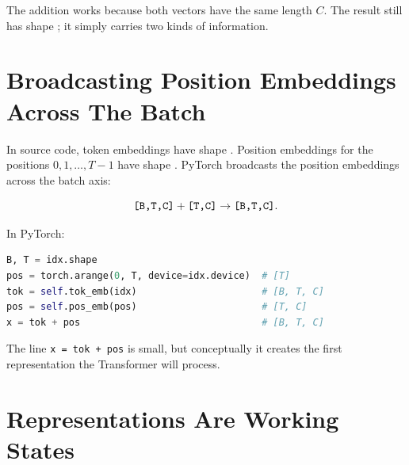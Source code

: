 The addition works because both vectors have the same length \(C\). The result still has shape \shape{[C]}; it simply carries two kinds of information.

\section{Broadcasting Position Embeddings Across The Batch}

In source code, token embeddings have shape \shape{[B,T,C]}. Position embeddings for the positions \(0,1,\ldots,T-1\) have shape \shape{[T,C]}. PyTorch broadcasts the position embeddings across the batch axis:

\[
\texttt{[B,T,C]} + \texttt{[T,C]} \rightarrow \texttt{[B,T,C]}.
\]

\begin{center}
\end{center}

In PyTorch:

\begin{lstlisting}[language=Python]
B, T = idx.shape
pos = torch.arange(0, T, device=idx.device)  # [T]
tok = self.tok_emb(idx)                      # [B, T, C]
pos = self.pos_emb(pos)                      # [T, C]
x = tok + pos                                # [B, T, C]
\end{lstlisting}

The line \texttt{x = tok + pos} is small, but conceptually it creates the first representation the Transformer will process.

\section{Representations Are Working States}

